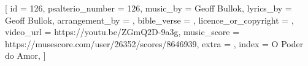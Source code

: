 
[
    id                     = {126},
    psalterio_number       = {126},
    music_by               = {Geoff Bullok},
    lyrics_by              = {Geoff Bullok},
    arrangement_by         = {},
    bible_verse            = {},
    licence_or_copyright   = {},
    video_url              = {https://youtu.be/ZGmQ2D-9a3g},
    music_score            = {https://musescore.com/user/26352/scores/8646939},
    extra                  = {},
    index                  = {O Poder do Amor},
]


\beginverse

